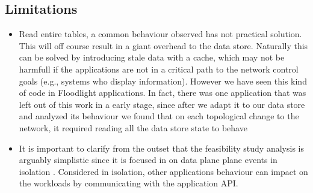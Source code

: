 \subsection{Limitations}
\begin{itemize}
\item Read entire tables, a common behaviour observed has not practical solution.  This will off course result in a giant overhead to the data store. Naturally this can be solved by introducing stale data with a cache, which may not be harmfull if the applications are not in a critical path to the network control goals (e.g., systems who display information). However we have seen this kind of code in Floodlight applications. In fact, there was one application that was left out of this work in a early stage, since after we adapt it to our data store and analyzed its behaviour we found that on each topological change to the network, it required reading all the data store state to behave 
\item It is important to clarify from the outset that the feasibility study analysis is arguably simplistic since it is focused in on data plane plane events in isolation . Considered in isolation,
other applications behaviour can impact on the workloads  by communicating with the application API.
\end{itemize}


